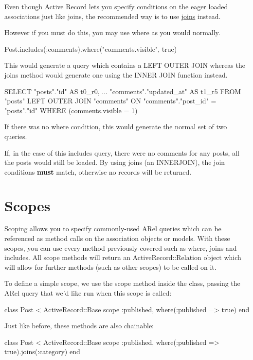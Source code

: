 \documentclass[10pt]{book}
\newenvironment{code}{%
  \scriptsize
    \verbatim
}{%
    \endverbatim
    \newline
}
\begin{document}
Even though Active Record lets you specify conditions on the eager loaded associations just like joins, the recommended way is to use \hyperlink{joining-tables}{joins} instead.

However if you must do this, you may use where as you would normally.
\begin{code}
Post.includes(:comments).where("comments.visible", true)
\end{code}

This would generate a query which contains a LEFT OUTER JOIN whereas the joins method would generate one using the INNER JOIN function instead.
\begin{code}
SELECT "posts"."id" AS t0_r0, ... "comments"."updated_at" AS t1_r5 
FROM "posts" 
LEFT OUTER JOIN "comments" ON "comments"."post_id" = "posts"."id" 
WHERE (comments.visible = 1)
\end{code}

If there was no where condition, this would generate the normal set of two queries.

If, in the case of this includes query, there were no comments for any posts, all the posts would still be loaded. By using joins (an INNERJOIN), the join conditions \textbf{must} match, otherwise no records will be returned.

\section{ Scopes}

Scoping allows you to specify commonly-used ARel queries which can be  referenced as method calls on the association objects or models. With  these scopes, you can use every method previously covered such as where, joins and includes. All scope methods will return an ActiveRecord::Relation object which will allow for further methods (such as other scopes) to be called on it.

To define a simple scope, we use the scope method inside the class, passing the ARel query that we’d like run when this scope is called:
\begin{code}
class Post < ActiveRecord::Base
  scope :published, where(:published => true)
end
\end{code}

Just like before, these methods are also chainable:
\begin{code}
class Post < ActiveRecord::Base
  scope :published, where(:published => true).joins(:category)
end
\end{code}
\end{document}
